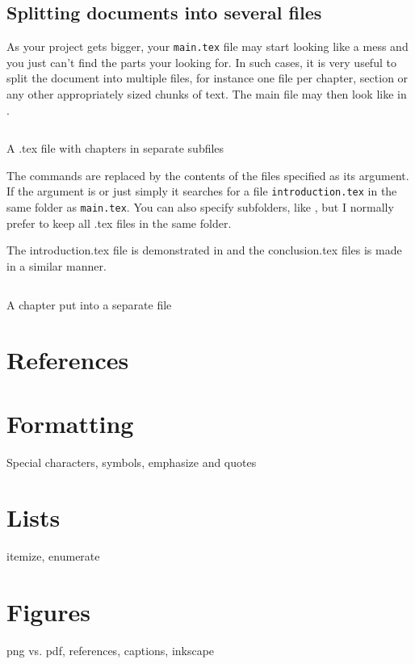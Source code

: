 \subsection{Splitting documents into several files}
As your project gets bigger, your \verb|main.tex| file may start looking like a mess and you just can't find the parts your looking for. In such cases, it is very useful to split the document into multiple files, for instance one file per chapter, section or any other appropriately sized chunks of text. The main file may then look like in .

\begin{listing}
	\inputminted{latex}{latex/multifiles.tex}
	\caption{A .tex file with chapters in separate subfiles}
	\label{lst:latex:multifiles}
\end{listing}

The \latexin{} commands are replaced by the contents of the files specified as its argument. If the argument is  or just simply  it searches for a file \verb|introduction.tex| in the same folder as \verb|main.tex|. You can also specify subfolders, like , but I normally prefer to keep all .tex files in the same folder.

The introduction.tex file is demonstrated in  and the conclusion.tex files is made in a similar manner.

\begin{listing}
	\inputminted{latex}{latex/introduction.tex}
	\caption{A chapter put into a separate file}
	\label{lst:latex:introduction}
\end{listing}

\section{References}

\section{Formatting}
Special characters, symbols, emphasize and quotes

\section{Lists}
itemize, enumerate

\section{Figures}
png vs. pdf, references, captions, inkscape

